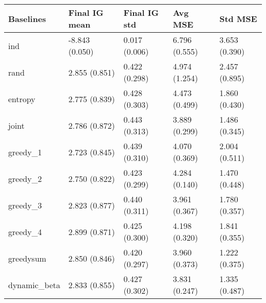 \begin{tabular}{lllll}
\toprule
    Baselines &   Final IG mean &   Final IG std &        Avg MSE &        Std MSE \\
\midrule
          ind &  -8.843 (0.050) &  0.017 (0.006) &  6.796 (0.555) &  3.653 (0.390) \\
         rand &   2.855 (0.851) &  0.422 (0.298) &  4.974 (1.254) &  2.457 (0.895) \\
      entropy &   2.775 (0.839) &  0.428 (0.303) &  4.473 (0.499) &  1.860 (0.430) \\
        joint &   2.786 (0.872) &  0.443 (0.313) &  3.889 (0.299) &  1.486 (0.345) \\
     greedy\_1 &   2.723 (0.845) &  0.439 (0.310) &  4.070 (0.369) &  2.004 (0.511) \\
     greedy\_2 &   2.750 (0.822) &  0.423 (0.299) &  4.284 (0.140) &  1.470 (0.448) \\
     greedy\_3 &   2.823 (0.877) &  0.440 (0.311) &  3.961 (0.367) &  1.780 (0.357) \\
     greedy\_4 &   2.899 (0.871) &  0.425 (0.300) &  4.198 (0.320) &  1.841 (0.355) \\
    greedysum &   2.850 (0.846) &  0.420 (0.297) &  3.960 (0.373) &  1.222 (0.375) \\
 dynamic\_beta &   2.833 (0.855) &  0.427 (0.302) &  3.831 (0.247) &  1.335 (0.487) \\
\bottomrule
\end{tabular}
